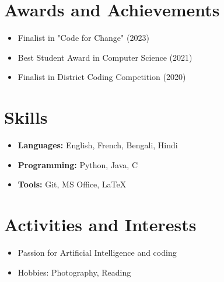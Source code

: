 \documentclass[a4paper,10pt]{article}
\begin{document}
\vspace{0.5cm}

\section*{Awards and Achievements}
\begin{itemize}
    \item Finalist in "Code for Change" (2023)
    \item Best Student Award in Computer Science (2021)
    \item Finalist in District Coding Competition (2020)
\end{itemize}

\section*{Skills}
\begin{itemize}
    \item \textbf{Languages:} English, French, Bengali, Hindi
    \item \textbf{Programming:} Python, Java, C
    \item \textbf{Tools:} Git, MS Office, LaTeX
\end{itemize}

\section*{Activities and Interests}
\begin{itemize}
    \item Passion for Artificial Intelligence and coding
    \item Hobbies: Photography, Reading
\end{itemize}
\end{document}
